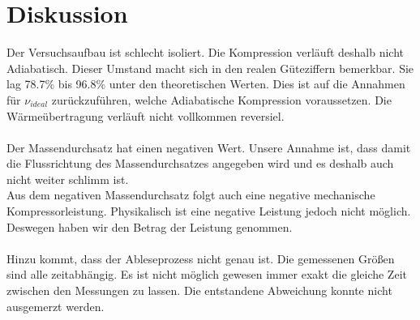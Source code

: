 \section{Diskussion}
\label{sec:Diskussion}

Der Versuchsaufbau ist schlecht isoliert. Die Kompression verläuft deshalb nicht Adiabatisch. Dieser Umstand macht sich in 
den realen Güteziffern bemerkbar.
Sie lag 78.7\% bis 96.8\% unter den theoretischen Werten. Dies ist auf die Annahmen für $ν_{ideal}$ zurückzuführen,
welche Adiabatische Kompression voraussetzen. Die Wärmeübertragung verläuft nicht vollkommen reversiel.
\\
\\
Der Massendurchsatz hat einen negativen Wert. Unsere Annahme ist, dass damit die Flussrichtung des Massendurchsatzes angegeben wird 
und es deshalb auch nicht weiter schlimm ist.
\\
Aus dem negativen Massendurchsatz folgt auch eine negative mechanische Kompressorleistung. Physikalisch ist eine negative Leistung jedoch nicht möglich. 
Deswegen haben wir den Betrag der Leistung genommen.\\
\\
Hinzu kommt, dass der Ableseprozess nicht genau ist.
Die gemessenen Größen sind alle zeitabhängig. Es ist nicht möglich gewesen immer exakt die gleiche Zeit zwischen den Messungen zu lassen.
Die entstandene Abweichung konnte nicht ausgemerzt werden.\\

\newpage